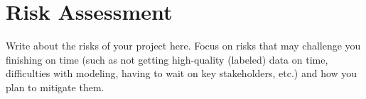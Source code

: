 \section{Risk Assessment}
\label{sec:risk_assessment}
Write about the risks of your project here. Focus on risks that may challenge you finishing on time (such as not getting high-quality (labeled) data on time, difficulties with modeling, having to wait on key stakeholders, etc.) and how you plan to mitigate them.